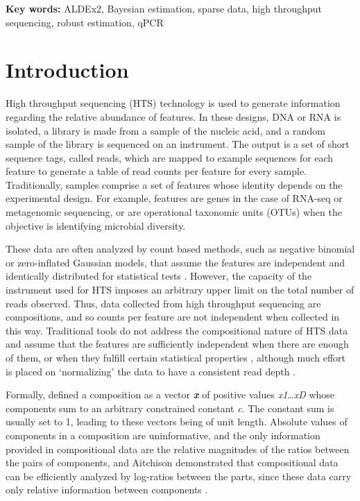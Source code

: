 \documentclass [10pt]{article}
\begin{document}
{\bf Key words: } ALDEx2, Bayesian estimation, sparse data, high throughput sequencing, robust estimation, qPCR

\vskip 1cm

\newpage

\section{Introduction}
\vskip-0.25cm High throughput sequencing (HTS) technology is used to generate information regarding the relative abundance of features.  In these designs, DNA or RNA is isolated, a library is made from a  sample of the nucleic acid, and a random sample of the library is sequenced on an instrument. The output is a set of short sequence tags, called reads, which are mapped to example sequences for each feature to generate a table of read counts per feature for every sample. Traditionally, samples comprise a set of features whose identity depends on the experimental design. For example, features are genes in the case of RNA-seq or  metagenomic sequencing, or are operational taxonomic units (OTUs) when the objective is identifying microbial diversity. 

These data are often analyzed by count based methods, such as negative binomial or zero-inflated Gaussian models, that assume the features are independent and identically distributed for statistical tests . However,  the capacity of the instrument used for HTS imposes an arbitrary upper limit on the total number of reads observed. Thus, data collected from high throughput sequencing are compositions, and so counts per feature are not independent when collected in this way. Traditional tools do not address the compositional nature of HTS data  and assume that the features are sufficiently independent when there are enough of them, or when they fulfill certain statistical properties , although much effort is placed on `normalizing' the data to have a consistent read depth .

Formally,  defined a composition as a vector \textit{\textbf{x}}  of positive values \textit{x1}\ldots\textit{xD} whose components  sum to an arbitrary constrained constant \textit{c}. The constant sum is usually set to 1, leading to these vectors being of unit length. Absolute values of components in a composition are uninformative, and the only information provided in compositional data are the relative magnitudes of the ratios between the pairs of components, and Aitchison demonstrated that compositional data  can be efficiently analyzed by log-ratios between the parts, since these data carry only relative information between components .
\end{document}
